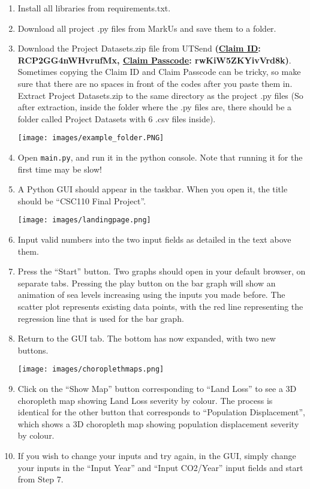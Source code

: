 \documentclass[fontsize=11pt]{article}
\begin{document}
\begin{enumerate}
    \item Install all libraries from requirements.txt.
    \item Download all project .py files from MarkUs and save them to a folder.
    \item Download the Project Datasets.zip file from UTSend \textbf{(\underline{Claim ID}: RCP2GG4nWHvrufMx, \underline{Claim Passcode}: rwKiW5ZKYivVrd8k)}. Sometimes copying the Claim ID and Claim Passcode can be tricky, so make sure that there are no spaces in front of the codes after you paste them in. Extract Project Datasets.zip to the same directory as the project .py files (So after extraction, inside the folder where the .py files are, there should be a folder called Project Datasets with 6 .csv files inside).
    
    \texttt{[image: images/example\_folder.PNG]}
    
    \item Open \texttt{main.py}, and run it in the python console. Note that running it for the first time may be slow!
    \item A Python GUI should appear in the taskbar. When you open it, the title should be “CSC110 Final Project”.

\texttt{[image: images/landingpage.png]}

    \item Input valid numbers into the two input fields as detailed in the text above them. 
    \item Press the “Start” button. Two graphs should open in your default browser, on separate tabs. Pressing the play button on the bar graph will show an animation of sea levels increasing using the inputs you made before. The scatter plot represents existing data points, with the red line representing the regression line that is used for the bar graph.
    \item Return to the GUI tab. The bottom has now expanded, with two new buttons.

\texttt{[image: images/choroplethmaps.png]}
    
    \item Click on the “Show Map” button corresponding to “Land Loss” to see a 3D choropleth map showing Land Loss severity by colour. The process is identical for the other button that corresponds to “Population Displacement”, which shows a 3D choropleth map showing population displacement severity by colour.
    \item If you wish to change your inputs and try again, in the GUI, simply change your inputs in the “Input Year” and “Input CO2/Year” input fields and start from Step 7.


\end{enumerate}
\end{document}
